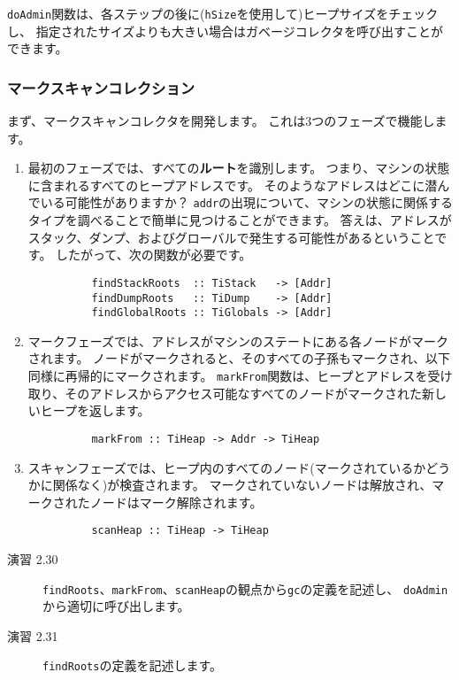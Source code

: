 \documentclass{jarticle}
\begin{document}
\texttt{doAdmin}関数は、各ステップの後に(\texttt{hSize}を使用して)ヒープサイズをチェックし、
指定されたサイズよりも大きい場合はガベージコレクタを呼び出すことができます。

\subsubsection{マークスキャンコレクション}

まず、マークスキャンコレクタを開発します。
これは3つのフェーズで機能します。

\begin{enumerate}
	\item 最初のフェーズでは、すべての\textbf{ルート}を識別します。 つまり、マシンの状態に含まれるすべてのヒープアドレスです。
	      そのようなアドレスはどこに潜んでいる可能性がありますか？
	      \texttt{addr}の出現について、マシンの状態に関係するタイプを調べることで簡単に見つけることができます。
	      答えは、アドレスがスタック、ダンプ、およびグローバルで発生する可能性があるということです。
	      したがって、次の関数が必要です。
	      \begin{verbatim}
          findStackRoots  :: TiStack   -> [Addr]
          findDumpRoots   :: TiDump    -> [Addr]
          findGlobalRoots :: TiGlobals -> [Addr]
        \end{verbatim}
	\item マークフェーズでは、アドレスがマシンのステートにある各ノードがマークされます。
	      ノードがマークされると、そのすべての子孫もマークされ、以下同様に再帰的にマークされます。
	      \texttt{markFrom}関数は、ヒープとアドレスを受け取り、そのアドレスからアクセス可能なすべてのノードがマークされた新しいヒープを返します。
	      \begin{verbatim}
          markFrom :: TiHeap -> Addr -> TiHeap
        \end{verbatim}
	\item スキャンフェーズでは、ヒープ内のすべてのノード(マークされているかどうかに関係なく)が検査されます。
	      マークされていないノードは解放され、マークされたノードはマーク解除されます。
	      \begin{verbatim}
          scanHeap :: TiHeap -> TiHeap
        \end{verbatim}
\end{enumerate}

\begin{description}
	\item[演習 2.30] \texttt{findRoots}、\texttt{markFrom}、\texttt{scanHeap}の観点から\texttt{gc}の定義を記述し、
		\texttt{doAdmin}から適切に呼び出します。
	\item[演習 2.31] \texttt{findRoots}の定義を記述します。
\end{description}
\end{document}
